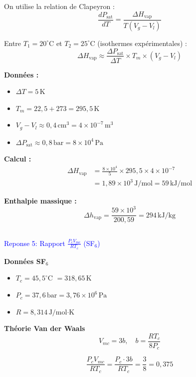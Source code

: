 		On utilise la relation de Clapeyron :
		\begin{equation}
			\frac{dP_\text{sat}}{dT} = \frac{\Delta H_\text{vap}}{T (V_g - V_l)}
		\end{equation}
		
		Entre $T_1 = 20^\circ$C et $T_2 = 25^\circ$C (isothermes expérimentales) :
		\[
		\Delta H_\text{vap} \approx \frac{\Delta P_\text{sat}}{\Delta T} \times T_m \times (V_g - V_l)
		\]
		
		\textbf{Données :}
		\begin{itemize}
			\item $\Delta T = 5\,\text{K}$
			\item $T_m = 22,5 + 273 = 295,5\,\text{K}$
			\item $V_g - V_l \approx 0,4\,\text{cm}^3 = 4\times10^{-7}\,\text{m}^3$
			\item $\Delta P_\text{sat} \approx 0,8\,\text{bar} = 8\times10^4\,\text{Pa}$
		\end{itemize}
		
		\textbf{Calcul :}
		\begin{align}
			\Delta H_\text{vap} &= \frac{8\times10^4}{5} \times 295,5 \times 4\times10^{-7} \\
			&= 1,89\times10^3 \,\text{J/mol} = 59\,\text{kJ/mol}
		\end{align}
		
		\textbf{Enthalpie massique :}
		\[
		\Delta h_\text{vap} = \frac{59\times10^3}{200,59} = 294\,\text{kJ/kg}
		\]
		
		
		
		
	\subsection*{}
	\textcolor{blue}{Reponse 5: Rapport $\frac{P_c V_{mc}}{RT_c}$ (SF$_6$)}
		
		\textbf{Données SF$_6$}
		\begin{itemize}
			\item $T_c = 45,5^\circ$C $= 318,65\,\text{K}$
			\item $P_c = 37,6\,\text{bar} = 3,76\times10^6\,\text{Pa}$
			\item $R = 8,314\,\text{J/mol·K}$
		\end{itemize}
		
		\textbf{Théorie Van der Waals}
		\[
		V_{mc} = 3b, \quad b = \frac{RT_c}{8P_c}
		\]
		
		\[
		\frac{P_c V_{mc}}{RT_c} = \frac{P_c \cdot 3b}{RT_c} = \frac{3}{8} = 0,375
		\]
		
